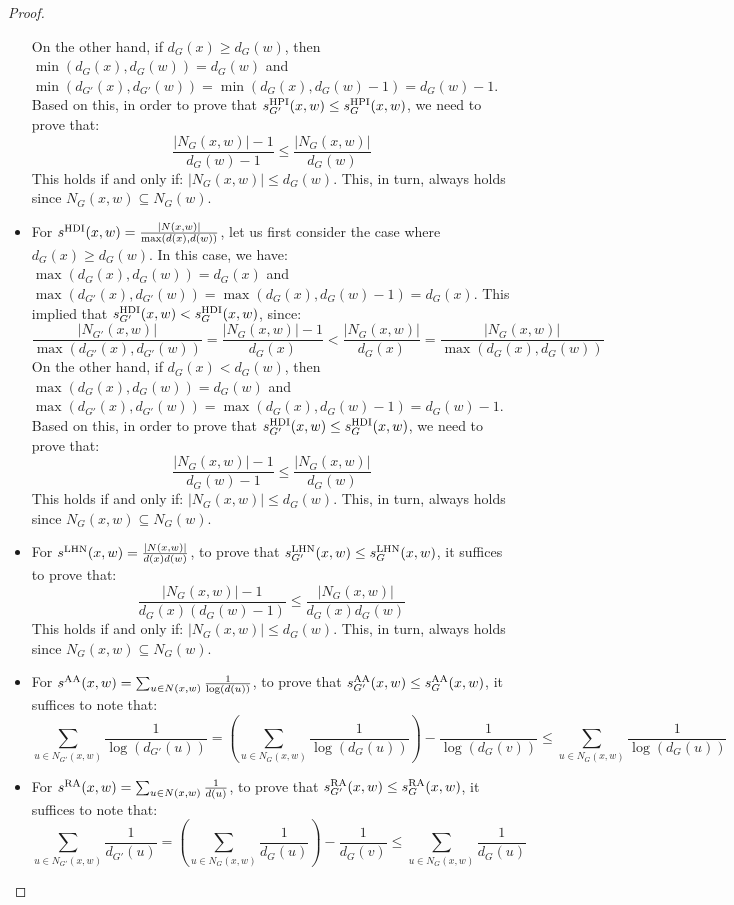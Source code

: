 \documentclass[twocolumn]{article}
\newcommand{\sHPI}{s^{\text{\normalfont HPI}}}
\newcommand{\sHDI}{s^{\text{\normalfont HDI}}}
\newcommand{\sLHN}{s^{\text{\normalfont LHN}}}
\newcommand{\sAA}{s^{\text{\normalfont AA}}}
\newcommand{\sRA}{s^{\text{\normalfont RA}}}
\begin{document}
\begin{proof}
\begin{itemize}
$$$$
On the other hand, if $d_G(x)\geq d_G(w)$, then $\min(d_G(x),d_G(w))=d_G(w)$ and $\min(d_{G'}(x),d_{G'}(w))=\min(d_{G}(x),d_{G}(w)-1)=d_{G}(w)-1$. Based on this, in order to prove that $\sHPI_{G'}(x,w)\leq \sHPI_G(x,w)$, we need to prove that:
$$
\frac{|N_G(x,w)|-1}{d_G(w)-1} \leq \frac{|N_G(x,w)|}{d_G(w)}
$$
This holds if and only if: $|N_G(x,w)|\leq d_G(w)$. This, in turn, always holds since $N_G(x,w)\subseteq N_G(w)$.
%
\item For $\sHDI(x,w)=\frac{|N(x,w)|}{\max(d(x),d(w))}$, let us first consider the case where $d_G(x)\geq d_G(w)$. In this case, we have: $\max(d_G(x),d_G(w))=d_G(x)$ and $\max(d_{G'}(x),d_{G'}(w))=\max(d_{G}(x),d_{G}(w)-1)=d_{G}(x)$. This implied that $\sHDI_{G'}(x,w)<\sHDI_{G}(x,w)$, since:
$$
\frac{|N_{G'}(x,w)|}{\max(d_{G'}(x),d_{G'}(w))} = \frac{|N_G(x,w)|-1}{d_G(x)} < \frac{|N_G(x,w)|}{d_G(x)} = \frac{|N_G(x,w)|}{\max(d_G(x),d_G(w))}
$$
On the other hand, if $d_G(x)<d_G(w)$, then $\max(d_G(x),d_G(w))=d_G(w)$ and $\max(d_{G'}(x),d_{G'}(w))=\max(d_{G}(x),d_{G}(w)-1)=d_{G}(w)-1$. Based on this, in order to prove that $\sHDI_{G'}(x,w)\leq \sHDI_G(x,w)$, we need to prove that:
$$
\frac{|N_G(x,w)|-1}{d_G(w)-1} \leq \frac{|N_G(x,w)|}{d_G(w)}
$$
This holds if and only if: $|N_G(x,w)|\leq d_G(w)$. This, in turn, always holds since $N_G(x,w)\subseteq N_G(w)$.
%
\item For $\sLHN(x,w)=\frac{|N(x,w)|}{d(x) d(w)}$, to prove that $\sLHN_{G'}(x,w)\leq \sLHN_G(x,w)$, it suffices to prove that:
$$
\frac{|N_G(x,w)|-1}{d_G(x) (d_G(w)-1)} \leq \frac{|N_G(x,w)|}{d_G(x) d_G(w)}
$$
This holds if and only if: $|N_G(x,w)|\leq d_G(w)$. This, in turn, always holds since $N_G(x,w)\subseteq N_G(w)$.
%
\item For $\sAA(x,w)=\sum_{u \in N(x,w)} \frac{1}{\log(d(u))}$, to prove that $\sAA_{G'}(x,w)\leq\sAA_{G}(x,w)$, it suffices to note that:
$$
\sum\limits_{u \in N_{G'}(x,w)}\frac{1}{\log(d_{G'}(u))} = \left(\sum\limits_{u \in N_{G}(x,w)}\frac{1}{\log(d_G(u))}\right) - \frac{1}{\log(d_G(v))} \leq  \sum\limits_{u \in N_{G}(x,w)}\frac{1}{\log(d_G(u))}
$$
%
\item For $\sRA(x,w)=\sum_{u \in N(x,w)} \frac{1}{d(u)}$, to prove that $\sRA_{G'}(x,w)\leq\sRA_{G}(x,w)$, it suffices to note that:
$$
\sum\limits_{u \in N_{G'}(x,w)}\frac{1}{d_{G'}(u)} = \left(\sum\limits_{u \in N_{G}(x,w)}\frac{1}{d_G(u)}\right) - \frac{1}{d_G(v)} \leq  \sum\limits_{u \in N_{G}(x,w)}\frac{1}{d_G(u)}
$$
\end{itemize}
\end{proof}
\end{document}
